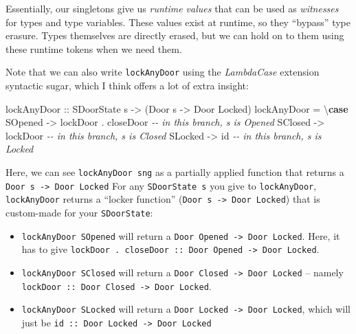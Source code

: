 \documentclass[]{article}
\newenvironment{Shaded}{}{}
\newcommand{\CommentTok}[1]{\textcolor[rgb]{0.38,0.63,0.69}{\textit{#1}}}
\newcommand{\DataTypeTok}[1]{\textcolor[rgb]{0.56,0.13,0.00}{#1}}
\newcommand{\FunctionTok}[1]{\textcolor[rgb]{0.02,0.16,0.49}{#1}}
\newcommand{\KeywordTok}[1]{\textcolor[rgb]{0.00,0.44,0.13}{\textbf{#1}}}
\newcommand{\NormalTok}[1]{#1}
\newcommand{\OperatorTok}[1]{\textcolor[rgb]{0.40,0.40,0.40}{#1}}
\newcommand{\OtherTok}[1]{\textcolor[rgb]{0.00,0.44,0.13}{#1}}
\begin{document}
Essentially, our singletons give us \emph{runtime values} that can be used as
\emph{witnesses} for types and type variables. These values exist at runtime, so
they ``bypass'' type erasure. Types themselves are directly erased, but we can
hold on to them using these runtime tokens when we need them.

Note that we can also write \texttt{lockAnyDoor} using the \emph{LambdaCase}
extension syntactic sugar, which I think offers a lot of extra insight:

\begin{Shaded}
\begin{Highlighting}[]
\OtherTok{lockAnyDoor ::} \DataTypeTok{SDoorState}\NormalTok{ s }\OtherTok{{-}>}\NormalTok{ (}\DataTypeTok{Door}\NormalTok{ s }\OtherTok{{-}>} \DataTypeTok{Door} \DataTypeTok{\textquotesingle{}Locked}\NormalTok{)}
\NormalTok{lockAnyDoor }\OtherTok{=}\NormalTok{ \textbackslash{}}\KeywordTok{case}
    \DataTypeTok{SOpened} \OtherTok{{-}>}\NormalTok{ lockDoor }\OperatorTok{.}\NormalTok{ closeDoor  }\CommentTok{{-}{-} in this branch, s is \textquotesingle{}Opened}
    \DataTypeTok{SClosed} \OtherTok{{-}>}\NormalTok{ lockDoor              }\CommentTok{{-}{-} in this branch, s is \textquotesingle{}Closed}
    \DataTypeTok{SLocked} \OtherTok{{-}>} \FunctionTok{id}                    \CommentTok{{-}{-} in this branch, s is \textquotesingle{}Locked}
\end{Highlighting}
\end{Shaded}

Here, we can see \texttt{lockAnyDoor\ sng} as a partially applied function that
returns a \texttt{Door\ s\ -\textgreater{}\ Door\ \textquotesingle{}Locked} For
any \texttt{SDoorState\ s} you give to \texttt{lockAnyDoor},
\texttt{lockAnyDoor} returns a ``locker function''
(\texttt{Door\ s\ -\textgreater{}\ Door\ \textquotesingle{}Locked}) that is
custom-made for your \texttt{SDoorState}:

\begin{itemize}
\item
  \texttt{lockAnyDoor\ SOpened} will return a
  \texttt{Door\ \textquotesingle{}Opened\ -\textgreater{}\ Door\ \textquotesingle{}Locked}.
  Here, it has to give
  \texttt{lockDoor\ .\ closeDoor\ ::\ Door\ \textquotesingle{}Opened\ -\textgreater{}\ Door\ \textquotesingle{}Locked}.
\item
  \texttt{lockAnyDoor\ SClosed} will return a
  \texttt{Door\ \textquotesingle{}Closed\ -\textgreater{}\ Door\ \textquotesingle{}Locked}
  -- namely
  \texttt{lockDoor\ ::\ Door\ \textquotesingle{}Closed\ -\textgreater{}\ Door\ \textquotesingle{}Locked}.
\item
  \texttt{lockAnyDoor\ SLocked} will return a
  \texttt{Door\ \textquotesingle{}Locked\ -\textgreater{}\ Door\ \textquotesingle{}Locked},
  which will just be
  \texttt{id\ ::\ Door\ \textquotesingle{}Locked\ -\textgreater{}\ Door\ \textquotesingle{}Locked}
\end{itemize}
\end{document}
